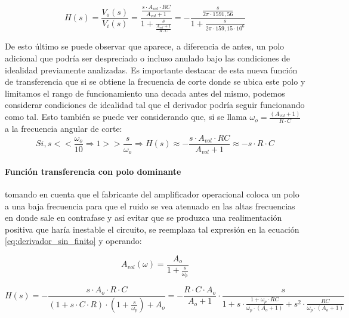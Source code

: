 \begin{equation}
	H(s) = \frac{V_o(s)}{V_i(s)} = \frac{\frac{s \cdot A_{vol} \cdot RC}{A_{vol} + 1}}{1 + \frac{s}{\frac{A_{vol} + 1}{R \cdot C}}}
	= - \frac{\frac{s}{2 \pi \cdot 1591,56}}{1 + \frac{s}{2 \pi \cdot 159,15 \cdot 10^{6}}}
	\label{eq:derivador_sin_finito}
\end{equation}

De esto \'ultimo se puede observar que aparece, a diferencia de antes, un polo adicional que podr\'ia ser despreciado o incluso anulado bajo las condiciones de idealidad previamente analizadas. Es importante destacar de esta nueva funci\'on de transferencia que si se obtiene la frecuencia de corte donde se ubica este polo y limitamos el rango de funcionamiento una decada antes del mismo, podemos considerar condiciones de idealidad tal que el derivador podr\'ia seguir funcionando como tal. Esto tambi\'en se puede ver considerando que, si se llama $\omega_o = \frac{(A_{vol} + 1)}{R \cdot C}$ a la frecuencia angular de corte:
\begin{equation*}
	Si, s << \frac{\omega_o}{10} \Rightarrow 1 >> \frac{s}{\omega_o} \Rightarrow 
	H(s) \approx - \frac{s \cdot A_{vol} \cdot RC}{A_{vol} + 1} \approx
	- s \cdot R \cdot C
\end{equation*}


\paragraph*{Funci\'on transferencia con polo dominante}tomando en cuenta que el fabricante del amplificador operacional coloca un polo a una baja frecuencia para que el ruido se vea atenuado en las altas frecuencias en donde sale en contrafase y as\'i evitar que se produzca una realimentaci\'on positiva que har\'ia inestable el circuito, se reemplaza tal expresi\'on en la ecuaci\'on \ref{eq:derivador_sin_finito} y operando:

\begin{equation}
	A_{vol}(\omega) = \frac{A_o}{1 + \frac{s}{\omega_p}}
	\label{eq:polo_dominante}
\end{equation}

\begin{equation}
	H(s) = - \frac{s \cdot A_{o} \cdot R \cdot C}{(1 + s \cdot C \cdot R) \cdot (1 + \frac{s}{\omega_p}) + A_{o}} = - \frac{R \cdot C \cdot A_{o}}{A_{o} + 1} \cdot \frac{s}{1 + s \cdot \frac{1 + \omega_p \cdot RC}{\omega_p \cdot(A_o + 1)} + s^{2} \cdot \frac{RC}{\omega_p \cdot (A_o + 1)}}
\end{equation}


